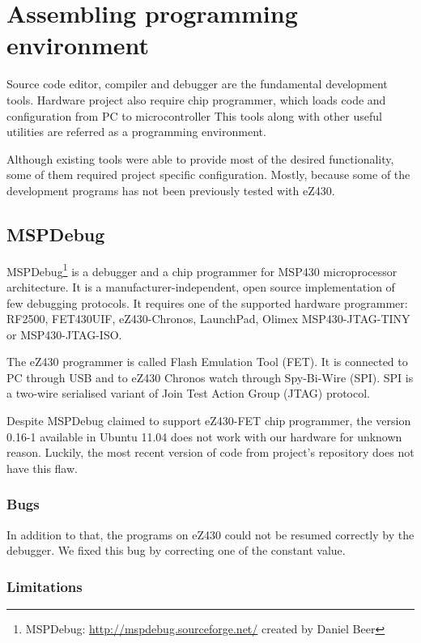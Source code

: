 \chapter{Assembling programming environment}

Source code editor, compiler and debugger are the fundamental development tools. 
Hardware project also require chip programmer, which loads code and configuration from PC to microcontroller
This tools along with other useful utilities are referred as a programming environment.

Although existing tools were able to provide most of the desired functionality, some of them required project specific configuration.
Mostly, because some of the development programs has not been previously tested with eZ430.


\section{MSPDebug}

MSPDebug\footnote{MSPDebug: \url{http://mspdebug.sourceforge.net/} created by Daniel Beer} is a debugger and a chip programmer for MSP430 microprocessor architecture.
It is a manufacturer-independent, open source implementation of few debugging protocols.
It requires one of the supported hardware programmer: RF2500, FET430UIF, eZ430-Chronos, LaunchPad, Olimex MSP430-JTAG-TINY or MSP430-JTAG-ISO.

The eZ430 programmer is called Flash Emulation Tool (FET).
It is connected to PC through USB and to eZ430 Chronos watch through Spy-Bi-Wire (SPI). 
SPI is a two-wire serialised variant of Join Test Action Group (JTAG) protocol.

Despite MSPDebug claimed to support eZ430-FET chip programmer, the version 0.16-1 available in Ubuntu 11.04 does not work with our hardware for unknown reason.
Luckily, the most recent version of code from project's repository does not have this flaw. 


\subsection{Bugs}
In addition to that, the programs on eZ430 could not be resumed correctly by the debugger.
We fixed this bug by correcting one of the constant value.

\subsection{Limitations}

